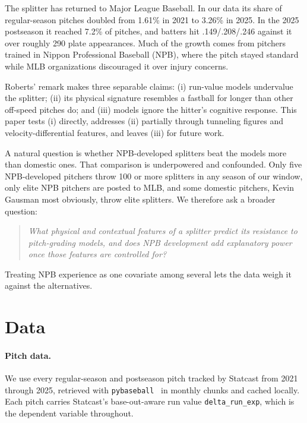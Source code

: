\documentclass[11pt]{article}
\newcommand{\code}[1]{\texttt{#1}}
\begin{document}
The splitter has returned to Major League Baseball. In our data its share of regular-season pitches doubled from 1.61\% in 2021 to 3.26\% in 2025. In the 2025 postseason it reached 7.2\% of pitches, and batters hit .149/.208/.246 against it over roughly 290 plate appearances. Much of the growth comes from pitchers trained in Nippon Professional Baseball (NPB), where the pitch stayed standard while MLB organizations discouraged it over injury concerns.

Roberts' remark makes three separable claims: (i) run-value models undervalue the splitter; (ii) its physical signature resembles a fastball for longer than other off-speed pitches do; and (iii) models ignore the hitter's cognitive response. This paper tests (i) directly, addresses (ii) partially through tunneling figures and velocity-differential features, and leaves (iii) for future work.

A natural question is whether NPB-developed splitters beat the models more than domestic ones. That comparison is underpowered and confounded. Only five NPB-developed pitchers throw 100 or more splitters in any season of our window, only elite NPB pitchers are posted to MLB, and some domestic pitchers, Kevin Gausman most obviously, throw elite splitters. We therefore ask a broader question:

\begin{quote}
\emph{What physical and contextual features of a splitter predict its resistance to pitch-grading models, and does NPB development add explanatory power once those features are controlled for?}
\end{quote}

Treating NPB experience as one covariate among several lets the data weigh it against the alternatives.

\section{Data}

\paragraph{Pitch data.} We use every regular-season and postseason pitch tracked by Statcast from 2021 through 2025, retrieved with \code{pybaseball}~\cite{pybaseball} in monthly chunks and cached locally. Each pitch carries Statcast's base-out-aware run value \code{delta\_run\_exp}, which is the dependent variable throughout.
\end{document}
